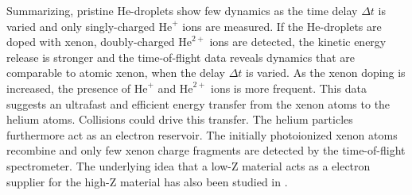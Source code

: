 %
Summarizing, pristine He-droplets show few dynamics as the time delay $\Delta t$ is varied and only singly-charged $\text{He}^{+}$ ions are measured. If the He-droplets are doped with xenon, doubly-charged $\text{He}^{2+}$ ions are detected, the kinetic energy release is stronger and the time-of-flight data reveals dynamics that are comparable to atomic xenon, when the delay $\Delta t$ is varied. As the xenon doping is increased, the presence of $\text{He}^{+}$ and $\text{He}^{2+}$ ions is more frequent. This data suggests an ultrafast and efficient energy transfer from the xenon atoms to the helium atoms. Collisions could drive this transfer. The helium particles furthermore act as an electron reservoir. The initially photoionized xenon atoms recombine and only few xenon charge fragments are detected by the time-of-flight spectrometer. The underlying idea that a low-Z material acts as a electron supplier for the high-Z material has also been studied in \citep{Hoener-2008-JPB}.
%
%
%
